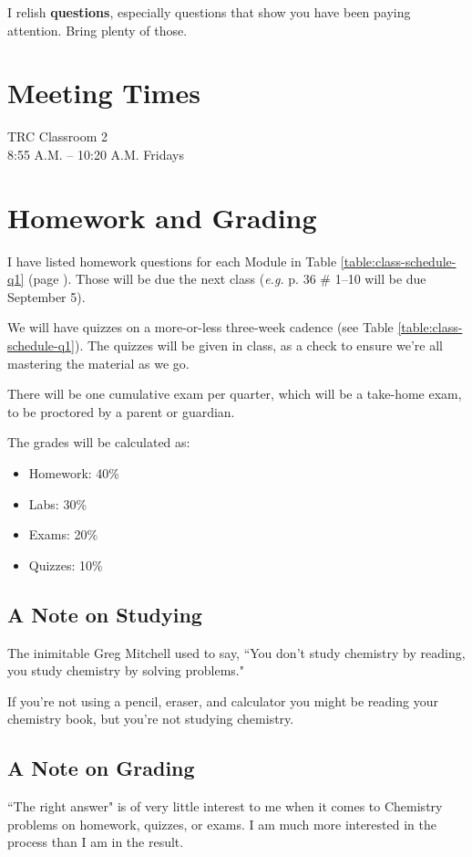 \documentclass[11pt, oneside]{article}   	%
\begin{document}
I relish \textbf{questions}, especially questions that show you have been paying attention. Bring plenty of those.

\section{Meeting Times}
TRC Classroom 2       \\
8:55 A.M. -- 10:20 A.M. Fridays \\ 


\section{Homework and Grading}
I have listed homework questions for each Module in Table \ref{table:class-schedule-q1} (page \pageref{table:class-schedule-q1}).
Those will be due the next class (\emph{e.g.} p. 36 \# 1--10 will be due September 5).

We will have quizzes on a more-or-less three-week cadence (see Table \ref{table:class-schedule-q1}).
The quizzes will be given in class, as a check to ensure we're all mastering the material as we go.

There will be one cumulative exam per quarter, which will be a take-home exam, to be proctored by a parent or guardian.

The grades will be calculated as:
\begin{itemize}
\item Homework: 40\%
\item Labs: 30\%
\item Exams: 20\%
\item Quizzes: 10\%
\end{itemize}

\subsection{A Note on Studying}
The inimitable Greg Mitchell used to say, ``You don't study chemistry by reading, you study chemistry by solving problems."

If you're not using a pencil, eraser, and calculator you might be reading your chemistry book, but you're not studying chemistry.

\subsection{A Note on Grading}
 ``The right answer" is of very little interest to me when it comes to Chemistry problems on homework, quizzes, or exams. 
I am much more interested in the process than I am in the result. 
\end{document}
